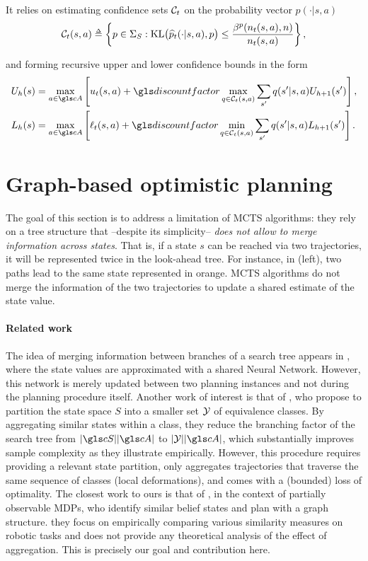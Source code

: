 It relies on estimating confidence sets $\mathcal{C}_t$ on the probability vector $p(\cdot|s,a)$
$$\cC_t(s,a) \eqdef \left\{p\in \Sigma_S :  \KL\!\big(\hp_t(\cdot|s,a),p\big) \leq \frac {\beta^p(n_t(s,a), n)} {n_t(s,a)}\right\},$$

and forming recursive upper and lower confidence bounds in the form
\begin{align*}
U_{h}(s) &= \max_{a\in \cA} \left[u_t(s,a) + \discount \max_{q \in \cC_t(s,a)} \sum_{s'} q(s'|s,a) U_{h+1}(s')\right], \\
L_{h}(s) &= \max_{a\in \cA} \left[\ell_t(s,a) + \discount \min_{q \in \cC_t(s,a)} \sum_{s'} q(s'|s,a)L_{h+1}(s')\right].
\end{align*}

\section{Graph-based optimistic planning}
\label{sec:gbop}


The goal of this section is to address a limitation of \gls{MCTS} algorithms: they rely on a tree structure that  --despite its simplicity-- \emph{does not allow to merge information across states}. That is, if a state $s$ can be reached via two trajectories, it will be represented twice in the look-ahead tree. For instance, in  (left), two paths lead to the same state represented in orange. \gls{MCTS} algorithms do not merge the information of the two trajectories to update a shared estimate of the state value.

\paragraph{Related work}

The idea of merging information between branches of a search tree appears in \citep{Silver2018}, where the state values are approximated with a shared Neural Network. However, this network is merely updated between two planning instances and not during the planning procedure itself.
Another work of interest is that of \citet{Hostetler14}, who propose to partition the state space $S$ into a smaller set $\mathcal{Y}$ of equivalence classes. By aggregating similar states within a class, they reduce the branching factor of the search tree from $|\cS||\cA|$ to $|\cY||\cA|$, which substantially improves sample complexity as they illustrate empirically. However, this procedure requires providing a relevant state partition, only aggregates trajectories that traverse the same sequence of classes (\ie local deformations), and comes with a (bounded) loss of optimality.
The closest work to ours is that of \citet{Ballesteros2013}, in the context of partially observable \glspl{MDP}, who identify similar belief states and plan with a graph structure. they focus on empirically comparing various similarity measures on robotic tasks and does not provide any theoretical analysis of the effect of aggregation. This is precisely our goal and contribution here.

